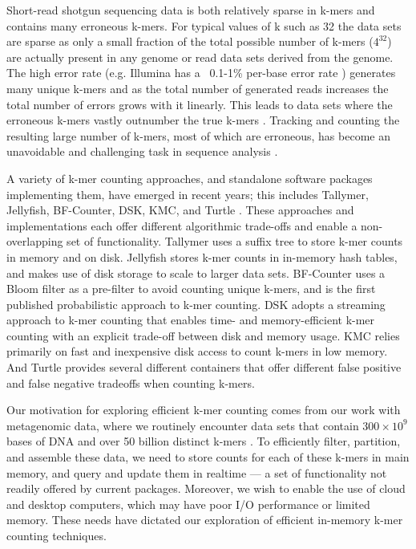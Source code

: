 \documentclass[10pt]{article}
\begin{document}

Short-read shotgun sequencing data is both relatively sparse in
k-mers and contains many erroneous k-mers.  For typical values of k such 
as 32 the data sets are sparse as only a small fraction of
the total possible number of k-mers ($4^{32}$) are actually present in
any genome or read data sets derived from the genome.  The 
high error rate (e.g. Illumina has a ~0.1-1\%
per-base error rate \cite{pubmed19997069}) generates many unique k-mers 
and as the total number of generated reads increases the
total number of errors grows with it linearly. This leads to data sets where the
erroneous k-mers vastly outnumber the true k-mers \cite{Conway2011}.
Tracking and counting the resulting large number of k-mers, most of
which are erroneous, has become an unavoidable and challenging task
in sequence analysis
\cite{Minoche2011}.

A variety of k-mer counting approaches, and standalone software
packages implementing them, have emerged in recent years; this
includes Tallymer, Jellyfish, BF-Counter, DSK, KMC, and Turtle \cite{Kurtz2008,
Marcais2011, Melsted2011, Rizk2013, Deorowicz2013, Roy2013}.
These
approaches and implementations each offer different algorithmic
trade-offs and enable a non-overlapping set
of functionality.  Tallymer uses a suffix tree to store k-mer counts
in memory and on disk.  Jellyfish stores k-mer counts in in-memory
hash tables, and makes use of disk storage to scale to larger
data sets.  BF-Counter uses a Bloom filter as a pre-filter to avoid
counting unique k-mers, and is the first published probabilistic approach
to k-mer counting.  DSK adopts a streaming approach to k-mer counting that
enables time- and memory-efficient k-mer counting with an explicit
trade-off between disk and memory usage.  KMC relies primarily
on fast and inexpensive disk access to count k-mers in low
memory.  And Turtle provides several different containers that offer
different false positive and false negative tradeoffs when counting k-mers.

Our motivation for exploring efficient k-mer counting comes from our
work with metagenomic data, where we routinely encounter data sets
that contain $300 \times 10^9$ bases of DNA and over 50 billion
distinct k-mers \cite{Howe2012}.  To efficiently filter,
partition, and assemble these data, we need to store counts for each
of these k-mers in main memory, and query and update them in realtime
--- a set of functionality not readily offered by current packages.
Moreover, we wish to enable the use of cloud and desktop
computers, which may have poor I/O performance or limited memory. These
needs have
dictated our exploration of efficient in-memory k-mer counting
techniques.
\end{document}
